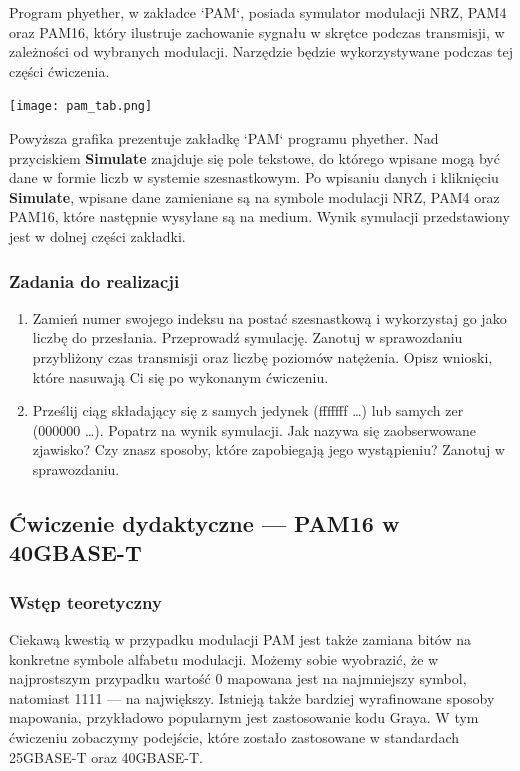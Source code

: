 Program phyether, w zakładce `PAM`, posiada symulator modulacji NRZ, PAM4 oraz PAM16, który ilustruje zachowanie sygnału w skrętce podczas transmisji, w zależności
od wybranych modulacji.
Narzędzie będzie wykorzystywane podczas tej części ćwiczenia.

\texttt{[image: pam\_tab.png]}

Powyższa grafika prezentuje zakładkę `PAM` programu phyether. Nad przyciskiem \textbf{Simulate} znajduje się pole tekstowe, do którego wpisane mogą być dane w formie
liczb w systemie szesnastkowym. Po wpisaniu danych i kliknięciu \textbf{Simulate}, wpisane dane zamieniane są na symbole modulacji NRZ, PAM4 oraz PAM16, które
następnie wysyłane są na medium. Wynik symulacji przedstawiony jest w dolnej części zakładki.

\subsubsection{Zadania do realizacji}

\begin{enumerate}
    \item Zamień numer swojego indeksu na postać szesnastkową i wykorzystaj go jako liczbę do przesłania. Przeprowadź symulację. Zanotuj w sprawozdaniu
    przybliżony czas transmisji oraz liczbę poziomów natężenia. Opisz wnioski, które nasuwają Ci się po wykonanym ćwiczeniu.
    \item Prześlij ciąg składający się z samych jedynek (fffffff \dots) lub samych zer (000000 \dots). Popatrz na wynik symulacji. Jak nazywa się zaobserwowane zjawisko? Czy znasz sposoby,
    które zapobiegają jego wystąpieniu? Zanotuj w sprawozdaniu.
\end{enumerate}

\subsection{Ćwiczenie dydaktyczne --- PAM16 w 40GBASE-T}
\subsubsection{Wstęp teoretyczny}
Ciekawą kwestią w przypadku modulacji PAM jest także zamiana bitów na konkretne symbole alfabetu modulacji.
Możemy sobie wyobrazić, że w najprostszym przypadku wartość 0 mapowana jest na najmniejszy symbol, natomiast 1111
--- na największy. Istnieją także bardziej wyrafinowane sposoby mapowania, przykładowo popularnym jest zastosowanie kodu Graya.
W tym ćwiczeniu zobaczymy podejście, które zostało zastosowane w standardach 25GBASE-T oraz 40GBASE-T.

